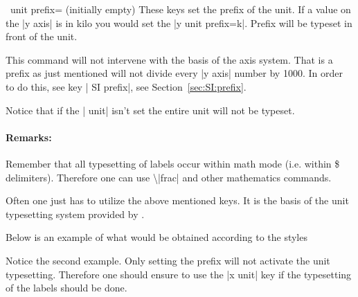 \begin{pgfplotsxykey}{\x\ unit prefix= (initially empty)}
    These keys set the prefix of the unit. If a value on the |y axis| is in
    kilo you would set the |y unit prefix=k|. Prefix will be typeset in front
    of the unit.

    This command will not intervene with the basis of the axis system. That is a
    prefix as just mentioned will not divide every |y axis| number by 1000. In
    order to do this, see key | SI prefix|, see
    Section~\ref{sec:SI:prefix}.

    Notice that if the | unit| isn't set the entire unit will not be
    typeset.


    \paragraph{Remarks:}

    Remember that all typesetting of labels occur within math mode (i.e.\@
    within \$ delimiters). Therefore one can use \textbackslash|frac| and
    other mathematics commands.
\end{pgfplotsxykey}

Often one just has to utilize the above mentioned keys. It is the basis of the
unit typesetting system provided by \PGFPlots{}.
%
\begin{codeexample}[]
\end{codeexample}

Below is an example of what would be obtained according to the styles
%
\begin{codeexample}[code only]
\pgfplotsset{use units,x unit=T,xlabel=Temperature,ylabel=Nothing}
\pgfplotsset{use units,x unit prefix=m,xlabel=Temperature,ylabel=Nothing}
\end{codeexample}
%
Notice the second example. Only setting the prefix will not activate the unit
typesetting. Therefore one should ensure to use the |x unit| key if the
typesetting of the labels should be done.

